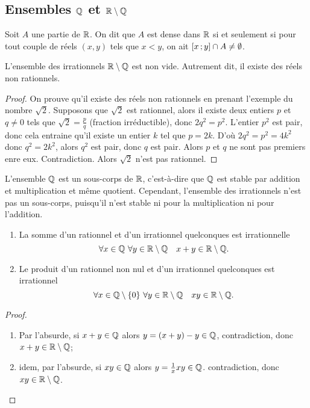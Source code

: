 \subsection{Ensembles \(\mathbb{Q}\) et \(\mathbb{R}\setminus\mathbb{Q}\)}

\begin{defdef}[Densité]
  Soit \(A\) une partie de \(\mathbb{R}\). On dit que \(A\) est dense dans \(\mathbb{R}\) si et seulement si pour tout couple de réels \((x,y)\) tels que \(x<y\), on ait \(\left[ x \, ;  y \right]\cap A \neq \emptyset\).
\end{defdef}
\begin{prop}
  L'ensemble des irrationnels \(\mathbb{R}\setminus\mathbb{Q}\) est non vide. Autrement dit, il existe des réels non rationnels.
\end{prop}
\begin{proof}
  On prouve  qu'il existe des réels non rationnels en prenant l'exemple du nombre \(\sqrt{2}\). Supposons que \(\sqrt{2}\) est rationnel, alors il existe deux entiers \(p\) et \(q \neq 0\) tels que \(\sqrt{2}=\frac{p}{q}\) (fraction irréductible), donc \(2q^2=p^2\). L'entier \(p^2\) est pair, donc cela entraine qu'il existe un entier \(k\) tel que \(p=2k\). D'où \(2q^2=p^2=4k^2\) donc \(q^2=2k^2\), alors \(q^2\) est pair, donc \(q\) est pair. Alors \(p\) et \(q\) ne sont pas premiers enre eux. Contradiction. Alors \(\sqrt{2}\) n'est pas rationnel.
\end{proof}

L'ensemble \(\mathbb{Q}\) est un sous-corps de \(\mathbb{R}\), c'est-à-dire que \(\mathbb{Q}\) est stable par addition et multiplication et même quotient. Cependant, l'ensemble des irrationnels n'est pas un sous-corps, puisqu'il n'est stable ni pour la multiplication ni pour l'addition.

\begin{prop}
  \begin{enumerate}
  \item La somme d'un rationnel et d'un irrationnel quelconques est irrationnelle
    \begin{equation}
      \forall x \in \mathbb{Q} \ \forall y \in \mathbb{R}\setminus\mathbb{Q} \quad x+y \in \mathbb{R}\setminus\mathbb{Q}.
    \end{equation}
  \item Le produit d'un rationnel non nul et d'un irrationnel quelconques est irrationnel
    \begin{equation}
      \forall x \in \mathbb{Q}\setminus\{0\} \ \forall y \in \mathbb{R}\setminus\mathbb{Q} \quad xy \in \mathbb{R}\setminus\mathbb{Q}.
    \end{equation}
  \end{enumerate}
\end{prop}
\begin{proof}
  \begin{enumerate}
  \item Par l'absurde, si \(x+y\in\mathbb{Q}\) alors \(y=(x+y)-y \in \mathbb{Q}\), contradiction, donc \(x+y\in\mathbb{R}\setminus\mathbb{Q}\);
  \item idem, par l'absurde, si \(xy\in \mathbb{Q}\) alors \(y=\frac{1}{x}xy\in\mathbb{Q}\). contradiction, donc \(xy\in\mathbb{R}\setminus\mathbb{Q}\).
  \end{enumerate}
\end{proof}

